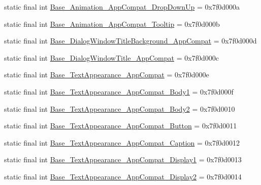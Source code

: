 \begin{DoxyCompactItemize}
\item 
static final int \mbox{\hyperlink{classandroid_1_1support_1_1v7_1_1appcompat_1_1_r_1_1style_a4aca380ad013eedfbbaff287c795f15f}{Base\+\_\+\+Animation\+\_\+\+App\+Compat\+\_\+\+Drop\+Down\+Up}} = 0x7f0d000a
\item 
static final int \mbox{\hyperlink{classandroid_1_1support_1_1v7_1_1appcompat_1_1_r_1_1style_a26dfea705746169245a38dac9010188e}{Base\+\_\+\+Animation\+\_\+\+App\+Compat\+\_\+\+Tooltip}} = 0x7f0d000b
\item 
static final int \mbox{\hyperlink{classandroid_1_1support_1_1v7_1_1appcompat_1_1_r_1_1style_a7be1e72934eb4819115aa709d7f0557c}{Base\+\_\+\+Dialog\+Window\+Title\+Background\+\_\+\+App\+Compat}} = 0x7f0d000d
\item 
static final int \mbox{\hyperlink{classandroid_1_1support_1_1v7_1_1appcompat_1_1_r_1_1style_abb6cb9ab09c33c7cd2c90e308f22f499}{Base\+\_\+\+Dialog\+Window\+Title\+\_\+\+App\+Compat}} = 0x7f0d000c
\item 
static final int \mbox{\hyperlink{classandroid_1_1support_1_1v7_1_1appcompat_1_1_r_1_1style_aafd21559a2cbd3a1242e39411a1c254c}{Base\+\_\+\+Text\+Appearance\+\_\+\+App\+Compat}} = 0x7f0d000e
\item 
static final int \mbox{\hyperlink{classandroid_1_1support_1_1v7_1_1appcompat_1_1_r_1_1style_a00a15bd8d16faa2ae2a57b12caa194ed}{Base\+\_\+\+Text\+Appearance\+\_\+\+App\+Compat\+\_\+\+Body1}} = 0x7f0d000f
\item 
static final int \mbox{\hyperlink{classandroid_1_1support_1_1v7_1_1appcompat_1_1_r_1_1style_a124b888677a509b72b45675f52a2a89a}{Base\+\_\+\+Text\+Appearance\+\_\+\+App\+Compat\+\_\+\+Body2}} = 0x7f0d0010
\item 
static final int \mbox{\hyperlink{classandroid_1_1support_1_1v7_1_1appcompat_1_1_r_1_1style_a827438275a100bb2fb760ef2221d58d0}{Base\+\_\+\+Text\+Appearance\+\_\+\+App\+Compat\+\_\+\+Button}} = 0x7f0d0011
\item 
static final int \mbox{\hyperlink{classandroid_1_1support_1_1v7_1_1appcompat_1_1_r_1_1style_a2ef1c9b096b9033d2f83f3ac6e9221ec}{Base\+\_\+\+Text\+Appearance\+\_\+\+App\+Compat\+\_\+\+Caption}} = 0x7f0d0012
\item 
static final int \mbox{\hyperlink{classandroid_1_1support_1_1v7_1_1appcompat_1_1_r_1_1style_adf7dad2dee465c9c31291d46810dad19}{Base\+\_\+\+Text\+Appearance\+\_\+\+App\+Compat\+\_\+\+Display1}} = 0x7f0d0013
\item 
static final int \mbox{\hyperlink{classandroid_1_1support_1_1v7_1_1appcompat_1_1_r_1_1style_a106d31659ce18797c37ec094836662a5}{Base\+\_\+\+Text\+Appearance\+\_\+\+App\+Compat\+\_\+\+Display2}} = 0x7f0d0014

\end{DoxyCompactItemize}

